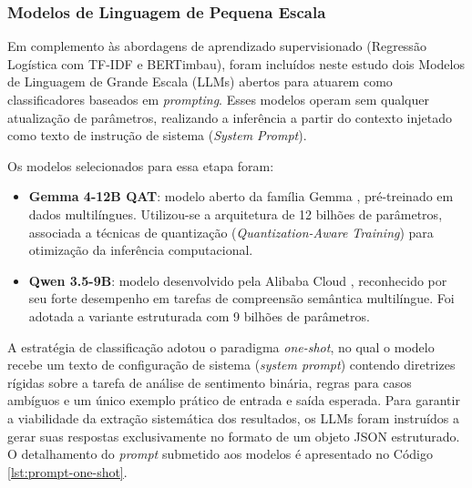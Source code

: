 \documentclass{IEEEtran}
\begin{document}
 

\subsubsection{Modelos de Linguagem de Pequena Escala}

Em complemento às abordagens de aprendizado supervisionado (Regressão Logística com TF-IDF e BERTimbau), foram incluídos neste estudo dois Modelos de Linguagem de Grande Escala (LLMs) abertos para atuarem como classificadores baseados em \textit{prompting}. Esses modelos operam sem qualquer atualização de parâmetros, realizando a inferência a partir do contexto injetado como texto de instrução de sistema (\textit{System Prompt}).

Os modelos selecionados para essa etapa foram:

\begin{itemize}
    \item \textbf{Gemma 4-12B QAT}: modelo aberto da família Gemma \cite{gemma_hf_2024}, pré-treinado em dados multilíngues. Utilizou-se a arquitetura de 12 bilhões de parâmetros, associada a técnicas de quantização (\textit{Quantization-Aware Training}) para otimização da inferência computacional.
    \item \textbf{Qwen 3.5-9B}: modelo desenvolvido pela Alibaba Cloud \cite{qwenteam2026qwen35omnitechnicalreport}, reconhecido por seu forte desempenho em tarefas de compreensão semântica multilíngue. Foi adotada a variante estruturada com 9 bilhões de parâmetros.
\end{itemize}


A estratégia de classificação adotou o paradigma \textit{one-shot}, no qual o modelo recebe um texto de configuração de sistema (\textit{system prompt}) contendo diretrizes rígidas sobre a tarefa de análise de sentimento binária, regras para casos ambíguos e um único exemplo prático de entrada e saída esperada. Para garantir a viabilidade da extração sistemática dos resultados, os LLMs foram instruídos a gerar suas respostas exclusivamente no formato de um objeto JSON estruturado. O detalhamento do \textit{prompt} submetido aos modelos é apresentado no Código \ref{lst:prompt-one-shot}.

\end{document}
